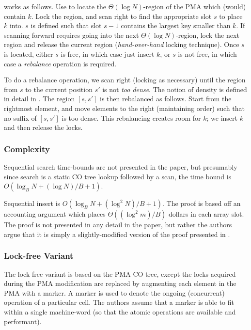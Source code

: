 \documentclass[preprint]{style}
\begin{document}
\Insert{} works as follows. Use \Search{} to locate the $\Theta(\log
N)$-region of the PMA which (would) contain $k$. Lock the region, and scan
right to find the appropriate slot $s$ to place $k$ into. $s$ is defined such
that slot $s - 1$ contains the largest key smaller than $k$. If scanning
forward requires going into the next $\Theta(\log N)$-region, lock the next
region and release the current region (\textit{hand-over-hand} locking
technique). Once $s$ is located, either $s$ is free, in which case just insert
$k$, or $s$ is not free, in which case a \textit{rebalance} operation is
required.

To do a rebalance operation, we scan right (locking as necessary) until the
region from $s$ to the current position $s'$ is not \textit{too dense}. The
notion of density is defined in detail in \cite{BenderFiGi05}. The region $[s,
s']$ is then rebalanced as follows. Start from the rightmost element, and move
elements to the right (maintaining order) such that no suffix of $[s, s']$ is
too dense. This rebalancing creates room for $k$; we insert $k$ and then
release the locks.

\vfill

\subsubsection{Complexity}


Sequential search time-bounds are not presented in the paper, but presumably
since search is a static CO tree lookup followed by a scan, the time bound is
$O(\log_{B}{N} + ({\log{N}})/{B} + 1)$.


Sequential insert is $O(\log_{B}{N} + (\log^2{N})/{B} + 1)$. The proof is based
off an accounting argument which places $\Theta((\log^2{m})/B)$ dollars in each
array slot. The proof is not presented in any detail in the paper, but rather
the authors argue that it is simply a slightly-modified version of the proof
presented in \cite{Katriel02}.

\vfill

\subsubsection{Lock-free Variant}

The lock-free variant is based on the PMA CO tree, except the locks acquired
during the PMA modification are replaced by augmenting each element in the PMA
with a marker. A marker is used to denote the ongoing (concurrent) operation of
a particular cell. The authors assume that a marker is able to fit within a
single machine-word (so that the atomic operations are available and
performant).
\end{document}
